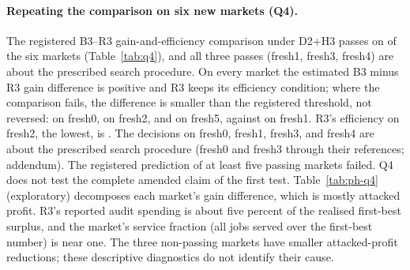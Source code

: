 \documentclass[11pt]{article}
\begin{document}
\paragraph{Repeating the comparison on six new markets (Q4).} The registered B3--R3 gain-and-efficiency comparison under D2+H3 passes on  of the six markets (Table~\ref{tab:q4}), and all three passes (fresh1, fresh3, fresh4) are about the prescribed search procedure. On every market the estimated B3 minus R3 gain difference is positive and R3 keeps its efficiency condition; where the comparison fails, the difference is smaller than the registered threshold, not reversed:  on fresh0,  on fresh2, and  on fresh5, against  on fresh1. R3's efficiency on fresh2, the lowest, is . The decisions on fresh0, fresh1, fresh3, and fresh4 are about the prescribed search procedure (fresh0 and fresh3 through their references; addendum). The registered prediction of at least five passing markets failed. Q4 does not test the complete amended claim of the first test. Table~\ref{tab:ph-q4} (exploratory) decomposes each market's gain difference, which is mostly attacked profit. R3's reported audit spending is about five percent of the realised first-best surplus, and the market's service fraction (all jobs served over the first-best number) is near one. The three non-passing markets have smaller attacked-profit reductions; these descriptive diagnostics do not identify their cause.
\begin{table}[t]\centering\small
{}
\caption{Exploratory, after the report: per fresh market, the B3 minus R3 gain difference split into its two terms, and under the selected attack R3's audit cost divided by the realised first-best surplus $S^*$ and the market's service fraction, the number of jobs served by all providers divided by the first-best number $T\min(J, \sum_i k_i)$; the service fraction is not the attacker's allocation share.}\label{tab:ph-q4}
\end{table}


\begin{table}[t]\centering\small
{}
\caption{Q4 per market: B3 minus R3 gain difference and its calibrated lower bound, R3's efficiency and lower bound, the raw one-sided bootstrap $p$-values of the two components, the calibrated market value $\max(p'_{\mathrm{gain}}, p'_{\mathrm{eff}})$ that enters Holm, its Holm-adjusted value, and the decision. The decisions on fresh0, fresh1, fresh3, and fresh4 are about the prescribed search procedure; the Decision column marks the direct flags (fresh1, fresh4) and the flags fresh0 and fresh3 inherit through their references (addendum).}\label{tab:q4}
\end{table}
\end{document}
